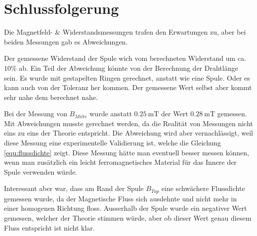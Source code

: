 \documentclass[../main.tex]{subfiles}
\begin{document}
\section{Schlussfolgerung}

Die Magnetfeld- \& Widerstandsmessungen trafen den Erwartungen zu, aber bei beiden Messungen gab es Abweichungen.

Der gemessene Widerstand der Spule wich vom berechneten Widerstand um ca. $10\%$ ab. Ein Teil der Abweichung könnte von der Berechnung der Drahtlänge sein. Es wurde mit gestapelten Ringen gerechnet, anstatt wie eine Spule. Oder es kann auch von der Toleranz her kommen. Der gemessene Wert selbst aber kommt sehr nahe dem berechnet nahe.

Bei der Messung von $B_{Mitte}$ wurde anstatt $\SI{0.25}{\milli\tesla}$ der Wert $\SI{0.28}{\milli\tesla}$ gemessen. Mit Abweichungen musste gerechnet werden, da die Realität von Messungen nicht eins zu eins der Theorie entspricht. Die Abweichung wird aber vernachlässigt, weil diese Messung eine experimentelle Validierung ist, welche die Gleichung \ref{equ:flussdichte} zeigt. Diese Messung hätte man eventuell besser messen können, wenn man zusätzlich ein leicht ferromagnetisches Material für das Innere der Spule verwenden würde.

Interessant aber war, dass am Rand der Spule $B_{Top}$ eine schwächere Flussdichte gemessen wurde, da der Magnetische Fluss sich ausdehnte und nicht mehr in einer homogenen Richtung floss. Ausserhalb der Spule wurde ein negativer Wert gemessen, welcher der Theorie stimmen würde, aber ob dieser Wert genau diesem Fluss entspricht ist nicht klar.
\end{document}
